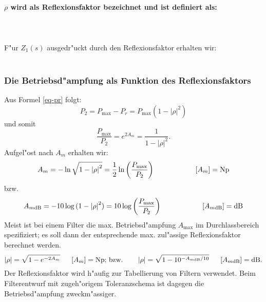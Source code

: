 \\~~\\
{\bf{\boldmath $\rho $} wird als Reflexionsfaktor bezeichnet und ist definiert als:}\\~~\\
\\~~\\
F"ur $Z_1(s)$ ausgedr"uckt durch den Reflexionsfaktor erhalten wir:\\~~\\

\subsubsection{Die Betriebsd"ampfung als Funktion des Reflexionsfaktors}
Aus Formel \ref{eq-pr} folgt:
\begin{equation}
P_2=P_{\max}-P_r=P_{\max} \left( 1-\left| \rho \right|^2 \right)
\end{equation}
und somit
\begin{equation}
\frac{P_{\max}}{P_2}=e^{2 A_m}=\frac{1}{1- \left| \rho \right|^2}.
\end{equation}
Aufgel"ost nach $A_m$ erhalten wir:
\begin{equation}
A_m=- \ln{\sqrt{1- \left| \rho \right|^2}}=\frac{1}{2}\ln{\left(\frac{P_{\max}}{P_2}\right)} \hspace*{2cm}
  \left[ A_m \right]={\rm Np}
\end{equation}
\nit bzw.
\[
A_{m\text{dB}}=- 10 \log{(1- \left| \rho \right|^2)}=10\log{\left(\frac{P_{\max}}{P_2}\right)}    \hspace*{2cm}
  \left[ A_{m\text{dB}} \right]={\rm dB}
\]
\nit Meist ist bei einem Filter die max. Betriebsd"ampfung $A_{\max}$ im
Durchlassbereich spezifiziert; es soll dann der entsprechende max.
zul"assige Reflexionsfaktor berechnet werden.
\begin{equation*}
\left| \rho \right|=\sqrt{1-e^{-2 A_m}} \hspace*{0.5cm}
  \left[ A_m \right]={\rm Np;}\text{ bzw.}\qquad\left| \rho \right|=\sqrt{1-10^{-A_{m\text{dB}}/10}}\hspace*{0.5cm}
  \left[ A_{m\text{dB}}\right]={\rm dB}.
\end{equation*}
\nit Der Reflexionsfaktor wird h"aufig zur Tabellierung von Filtern verwendet. Beim
Filterentwurf mit zugeh"origem Toleranzschema ist dagegen die
Betriebsd"ampfung zweckm"assiger.
